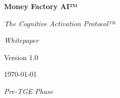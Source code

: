 
\begin{titlepage}
    \centering
    \vspace*{2cm}
    {\Huge\bfseries Money Factory AI™\par}
    \vspace{1cm}
    {\Large\itshape The Cognitive Activation Protocol™\par}
    \vspace{2cm}
    {\Large\itshape Whitepaper\par}
    \vspace{2cm}
    {\large Version 1.0\par}
    \vspace{1cm}
    {\large \today\par}
    \vfill
    {\large\itshape Pre-TGE Phase\par}
\end{titlepage}

\newpage 